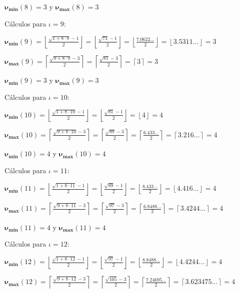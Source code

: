 \documentclass{amsart}
\theoremstyle{definition}
\theoremstyle{remark}
\numberwithin{equation}{section}
\newcommand{\monrel}[1]{\mathbf{#1}}
\newcommand{\funct}[1]{\monrel{#1}}
\newcommand{\functat}[2]{\funct{#1}{\left({#2}\right)}}
\begin{document}
$\functat{{\nu}_{\min}}{8} = 3$ y $\functat{{\nu}_{\max}}{8} = 3$


Cálculos para $\iota = 9$:


$\functat{{\nu}_{\min}}{9} =
\left\lfloor\frac{\sqrt{1+8 \cdot 9}-1}{2}\right\rfloor =
\left\lfloor\frac{\sqrt{73}-1}{2}\right\rfloor =
\left\lfloor\frac{7.0622...}{2}\right\rfloor =
\left\lfloor{3.5311...}\right\rfloor = 3
$


$\functat{{\nu}_{\max}}{9} =
\left\lceil\frac{\sqrt{9+8\cdot 9}-3}{2}\right\rceil =
\left\lceil\frac{\sqrt{81}-3}{2}\right\rceil =
\left\lceil{3}\right\rceil = 3
$


$\functat{{\nu}_{\min}}{9} = 3$ y $\functat{{\nu}_{\max}}{9} = 3$


Cálculos para $\iota = 10$:


$\functat{{\nu}_{\min}}{10} =
\left\lfloor\frac{\sqrt{1+8 \cdot 10}-1}{2}\right\rfloor =
\left\lfloor\frac{\sqrt{81}-1}{2}\right\rfloor =
\left\lfloor{4}\right\rfloor = 4
$


$\functat{{\nu}_{\max}}{10} =
\left\lceil\frac{\sqrt{9+8\cdot 10}-3}{2}\right\rceil =
\left\lceil\frac{\sqrt{89}-3}{2}\right\rceil =
\left\lceil\frac{6.433...}{2}\right\rceil =
\left\lceil{3.216...}\right\rceil = 4
$


$\functat{{\nu}_{\min}}{10} = 4$ y $\functat{{\nu}_{\max}}{10} = 4$


Cálculos para $\iota = 11$:


$\functat{{\nu}_{\min}}{11} =
\left\lfloor\frac{\sqrt{1+8 \cdot 11}-1}{2}\right\rfloor =
\left\lfloor\frac{\sqrt{89}-1}{2}\right\rfloor =
\left\lfloor\frac{8.433...}{2}\right\rfloor =
\left\lfloor{4.416...}\right\rfloor = 4
$


$\functat{{\nu}_{\max}}{11} =
\left\lceil\frac{\sqrt{9+8\cdot 11}-3}{2}\right\rceil =
\left\lceil\frac{\sqrt{97}-3}{2}\right\rceil =
\left\lceil\frac{6.8488...}{2}\right\rceil =
\left\lceil{3.4244...}\right\rceil = 4
$


$\functat{{\nu}_{\min}}{11} = 4$ y $\functat{{\nu}_{\max}}{11} = 4$


Cálculos para $\iota = 12$:


$\functat{{\nu}_{\min}}{12} =
\left\lfloor\frac{\sqrt{1+8 \cdot 12}-1}{2}\right\rfloor =
\left\lfloor\frac{\sqrt{97}-1}{2}\right\rfloor =
\left\lfloor\frac{8.8488...}{2}\right\rfloor =
\left\lfloor{4.4244...}\right\rfloor = 4
$


$\functat{{\nu}_{\max}}{12} =
\left\lceil\frac{\sqrt{9+8\cdot 12}-3}{2}\right\rceil =
\left\lceil\frac{\sqrt{105}-3}{2}\right\rceil =
\left\lceil\frac{7.24695...}{2}\right\rceil =
\left\lceil{3.623475...}\right\rceil = 4
$
\end{document}
